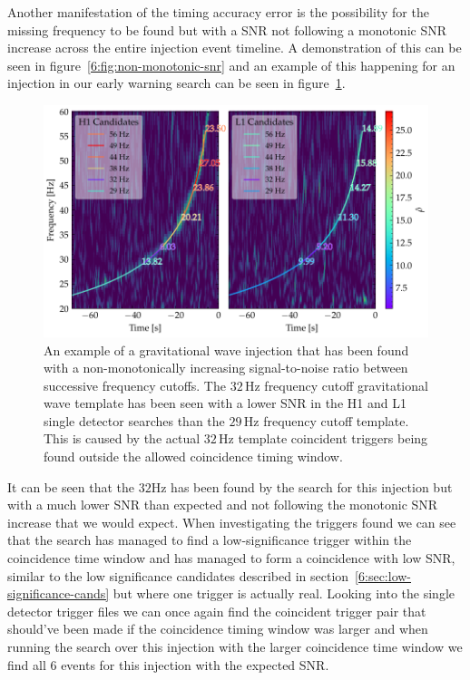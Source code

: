 Another manifestation of the timing accuracy error is the possibility for the missing frequency to be found but with a SNR not following a monotonic SNR increase across the entire injection event timeline. A demonstration of this can be seen in figure~\ref{6:fig:non-monotonic-snr} and an example of this happening for an injection in our early warning search can be seen in figure~\ref{6:fig:non_mono_eg}.
%
\begin{figure}
    \centering
    \includegraphics[width=1.0\linewidth]{images/6_earlywarning/stories/non_mono_example.pdf}
    \caption{An example of a gravitational wave injection that has been found with a non-monotonically increasing signal-to-noise ratio between successive frequency cutoffs. The $32 \, \text{Hz}$ frequency cutoff gravitational wave template has been seen with a lower SNR in the H1 and L1 single detector searches than the $29 \, \text{Hz}$ frequency cutoff template. This is caused by the actual $32 \, \text{Hz}$ template coincident triggers being found outside the allowed coincidence timing window.}
    \label{6:fig:non_mono_eg}
\end{figure}

It can be seen that the $32$Hz has been found by the search for this injection but with a much lower SNR than expected and not following the monotonic SNR increase that we would expect. When investigating the triggers found we can see that the search has managed to find a low-significance trigger within the coincidence time window and has managed to form a coincidence with low SNR, similar to the low significance candidates described in section~\ref{6:sec:low-significance-cands} but where one trigger is actually real. Looking into the single detector trigger files we can once again find the coincident trigger pair that should've been made if the coincidence timing window was larger and when running the search over this injection with the larger coincidence time window we find all $6$ events for this injection with the expected SNR.

